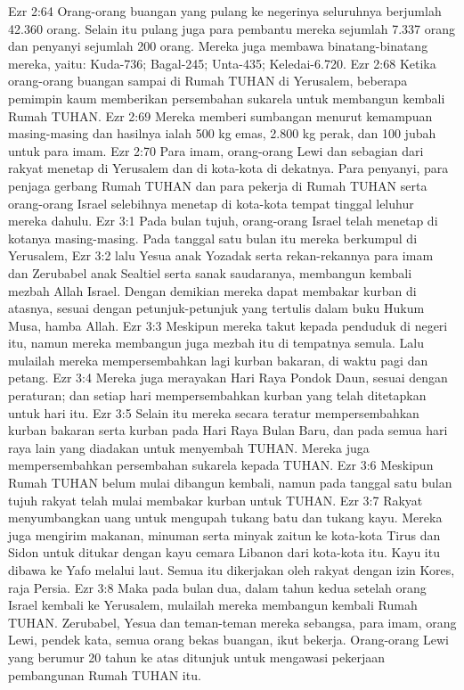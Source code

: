 Ezr 2:64  Orang-orang buangan yang pulang ke negerinya seluruhnya berjumlah 42.360 orang. Selain itu pulang juga para pembantu mereka sejumlah 7.337 orang dan penyanyi sejumlah 200 orang. Mereka juga membawa binatang-binatang mereka, yaitu: Kuda-736; Bagal-245; Unta-435; Keledai-6.720.
Ezr 2:68  Ketika orang-orang buangan sampai di Rumah TUHAN di Yerusalem, beberapa pemimpin kaum memberikan persembahan sukarela untuk membangun kembali Rumah TUHAN.
Ezr 2:69  Mereka memberi sumbangan menurut kemampuan masing-masing dan hasilnya ialah 500 kg emas, 2.800 kg perak, dan 100 jubah untuk para imam.
Ezr 2:70  Para imam, orang-orang Lewi dan sebagian dari rakyat menetap di Yerusalem dan di kota-kota di dekatnya. Para penyanyi, para penjaga gerbang Rumah TUHAN dan para pekerja di Rumah TUHAN serta orang-orang Israel selebihnya menetap di kota-kota tempat tinggal leluhur mereka dahulu.
Ezr 3:1  Pada bulan tujuh, orang-orang Israel telah menetap di kotanya masing-masing. Pada tanggal satu bulan itu mereka berkumpul di Yerusalem,
Ezr 3:2  lalu Yesua anak Yozadak serta rekan-rekannya para imam dan Zerubabel anak Sealtiel serta sanak saudaranya, membangun kembali mezbah Allah Israel. Dengan demikian mereka dapat membakar kurban di atasnya, sesuai dengan petunjuk-petunjuk yang tertulis dalam buku Hukum Musa, hamba Allah.
Ezr 3:3  Meskipun mereka takut kepada penduduk di negeri itu, namun mereka membangun juga mezbah itu di tempatnya semula. Lalu mulailah mereka mempersembahkan lagi kurban bakaran, di waktu pagi dan petang.
Ezr 3:4  Mereka juga merayakan Hari Raya Pondok Daun, sesuai dengan peraturan; dan setiap hari mempersembahkan kurban yang telah ditetapkan untuk hari itu.
Ezr 3:5  Selain itu mereka secara teratur mempersembahkan kurban bakaran serta kurban pada Hari Raya Bulan Baru, dan pada semua hari raya lain yang diadakan untuk menyembah TUHAN. Mereka juga mempersembahkan persembahan sukarela kepada TUHAN.
Ezr 3:6  Meskipun Rumah TUHAN belum mulai dibangun kembali, namun pada tanggal satu bulan tujuh rakyat telah mulai membakar kurban untuk TUHAN.
Ezr 3:7  Rakyat menyumbangkan uang untuk mengupah tukang batu dan tukang kayu. Mereka juga mengirim makanan, minuman serta minyak zaitun ke kota-kota Tirus dan Sidon untuk ditukar dengan kayu cemara Libanon dari kota-kota itu. Kayu itu dibawa ke Yafo melalui laut. Semua itu dikerjakan oleh rakyat dengan izin Kores, raja Persia.
Ezr 3:8  Maka pada bulan dua, dalam tahun kedua setelah orang Israel kembali ke Yerusalem, mulailah mereka membangun kembali Rumah TUHAN. Zerubabel, Yesua dan teman-teman mereka sebangsa, para imam, orang Lewi, pendek kata, semua orang bekas buangan, ikut bekerja. Orang-orang Lewi yang berumur 20 tahun ke atas ditunjuk untuk mengawasi pekerjaan pembangunan Rumah TUHAN itu.
